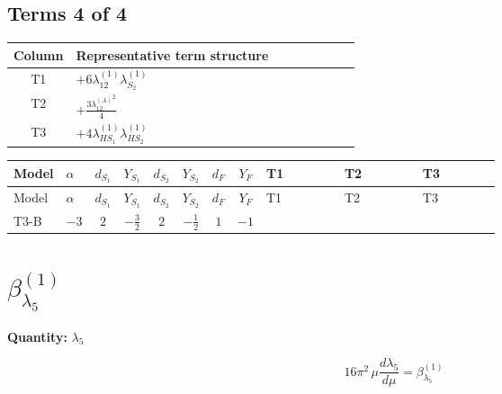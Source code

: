 \documentclass[8pt]{article}
\begin{document}
\begin{landscape}
\subsection*{Terms 4 of 4}
\begin{center}
\begin{tabular}{@{}c >{\raggedright\arraybackslash}p{0.82\linewidth}@{}}
\toprule
Column & Representative term structure \\
\midrule
T1 & \(\displaystyle +6 {\lambda_{12}^{(1)}} {\lambda_{S_2}^{(1)}}\) \\
\midrule
T2 & \(\displaystyle +\frac{3 {\lambda_{12}^{(A)}}^2}{4}\) \\
\midrule
T3 & \(\displaystyle +4 {\lambda_{HS_1}^{(1)}} {\lambda_{HS_2}^{(1)}}\) \\
\midrule
\bottomrule
\end{tabular}
\end{center}
\smallskip
\tiny
\begin{longtable}{@{}llcccccc >{\raggedright\arraybackslash}p{0.21\linewidth} >{\raggedright\arraybackslash}p{0.21\linewidth} >{\raggedright\arraybackslash}p{0.21\linewidth}@{}}
\toprule
Model & $\alpha$ & $d_{S_1}$ & $Y_{S_1}$ & $d_{S_2}$ & $Y_{S_2}$ & $d_F$ & $Y_F$ & T1 & T2 & T3 \\
\midrule
\endfirsthead
\toprule
Model & $\alpha$ & $d_{S_1}$ & $Y_{S_1}$ & $d_{S_2}$ & $Y_{S_2}$ & $d_F$ & $Y_F$ & T1 & T2 & T3 \\
\midrule
\endhead
T3-B & $-3$ & $2$ & $-\frac{3}{2}$ & $2$ & $-\frac{1}{2}$ & $1$ & $-1$ & \scriptsize\adjustbox{max width=\linewidth}{$\begin{gathered} +6 {\lambda_{12}^{(1)}} {\lambda_{S_2}^{(1)}}\end{gathered}$} & \scriptsize\adjustbox{max width=\linewidth}{$\begin{gathered} +\frac{3 {\lambda_{12}^{(A)}}^2}{4}\end{gathered}$} & \scriptsize\adjustbox{max width=\linewidth}{$\begin{gathered} +4 {\lambda_{HS_1}^{(1)}} {\lambda_{HS_2}^{(1)}}\end{gathered}$} \\
\midrule
\bottomrule
\end{longtable}
\clearpage
\section*{$\beta_{\lambda_5}^{(1)}$}
\noindent\textbf{Quantity: }$\lambda_5$\par\smallskip
\[16\pi^2\,\mu\frac{d \lambda_5}{d\mu}=\beta_{\lambda_5}^{(1)}\]

\end{landscape}
\end{document}
